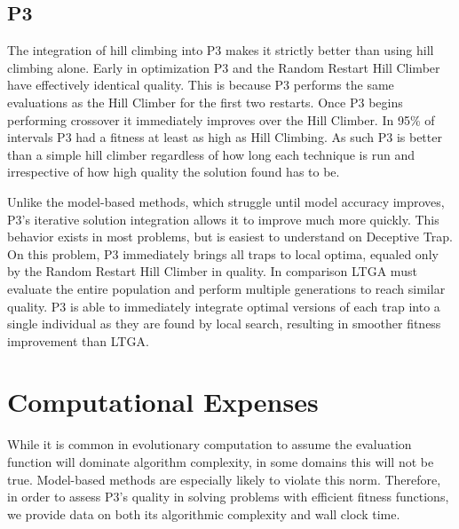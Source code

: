 \subsection{P3}
The integration of hill climbing into P3 makes it strictly better than using hill climbing alone.
Early in optimization P3 and the Random Restart Hill Climber have effectively identical quality. This is because
P3 performs the same evaluations as the Hill Climber for the first two restarts. Once P3 begins
performing crossover it immediately improves over the Hill Climber. In 95\% of intervals P3 had a fitness at
least as high as Hill Climbing. As such P3 is better than a simple
hill climber regardless of how long each technique is run and irrespective of how high quality the solution
found has to be.

Unlike the model-based methods, which struggle until model accuracy improves, P3's iterative solution
integration allows it to improve much more quickly. This behavior exists in most problems, but is easiest to understand on Deceptive Trap.
On this problem, P3 immediately brings all traps to local optima, equaled only by the Random Restart Hill Climber in quality.
In comparison LTGA must evaluate the entire population and perform multiple generations to reach similar quality.
P3 is able to immediately integrate optimal versions of each
trap into a single individual as they are found by local search, resulting in smoother fitness improvement than LTGA.

\section{Computational Expenses}
While it is common in evolutionary computation to assume the evaluation function will dominate algorithm
complexity, in some domains this will not be true. Model-based methods are especially likely to violate
this norm. Therefore, in order to assess P3's quality in solving problems with efficient fitness functions,
we provide data on both its algorithmic complexity and wall clock time.

